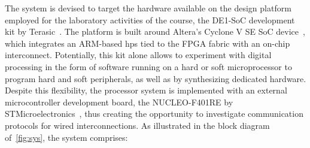 The system is devised to target the hardware available on the design platform employed for the laboratory activities of the course, the DE1-SoC development kit by Terasic~\cite{de1soc}. The platform is built around Altera's Cyclone V SE SoC device~\cite{cyclone}, which integrates an ARM-based \ac{hps} tied to the FPGA fabric with an on-chip interconnect.
Potentially, this kit alone allows to experiment with digital processing in the form of software running on a hard or soft microprocessor to program hard and soft peripherals, as well as by synthesizing dedicated hardware. Despite this flexibility, the processor system is implemented with an external microcontroller development board, the NUCLEO-F401RE by STMicroelectronics~\cite{nucleo}, thus creating the opportunity to investigate communication protocols for wired interconnections.
As illustrated in the block diagram of~\cref{fig:sys}, the system comprises:

